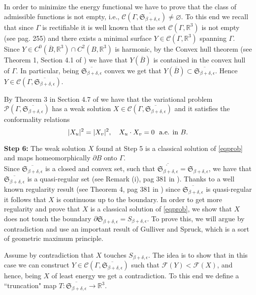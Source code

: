 \documentclass[a4paper,reqno,10pt,oneside]{amsart}
\numberwithin{equation}{section}
\begin{document}
In order to minimize the energy functional we have to prove that the class of admissible functions is not empty, i.e., $\mathcal{C}(\Gamma,\overline{\mathfrak{S}_{\beta+\delta,\epsilon}}) \neq \varnothing$.
To this end we recall that since $\Gamma$ is rectifiable it is well known that the set  $\mathcal{C}(\Gamma,{\mathbb R}^3)$ is not empty (see  \cite{MinSurf} pag. 255) and there exists a minimal surface $Y \in \mathcal{C}(\Gamma,{\mathbb R}^3)$ spanning $\Gamma$. Since $Y \in C^0(\overline{B}, {\mathbb R}^3) \cap C^2({B}, {\mathbb R}^3)$ is harmonic, by the Convex hull theorem (see Theorem 1, Section 4.1 of \cite{RegMinSurf}) we have that $Y(\overline{B})$ is contained in the convex hull of $\Gamma$. In particular, being $\overline{\mathfrak{S}_{\beta+\delta,\epsilon}}$ convex we get that $Y(\overline{B}) \subset\overline{\mathfrak{S}_{\beta+\delta,\epsilon}}$. Hence $Y \in  \mathcal{C}(\Gamma,\overline{\mathfrak{S}_{\beta+\delta,\epsilon}})$.

 By Theorem 3 in Section 4.7 of \cite{RegMinSurf} we have that the variational problem $\mathcal{P}(\Gamma,\overline{\mathfrak{S}_{\beta + \delta,\epsilon}})$ has a weak solution $X \in \mathcal{C}(\Gamma, \overline{\mathfrak{S}_{\beta + \delta,\epsilon}})$ and it satisfies the conformality relations
$$|X_u|^2=|X_v|^2, \ \ \ X_u \cdot X_v=0 \ \ \hbox{a.e. in}\ B. $$

\noindent\textbf{Step 6:} The weak solution $X$ found at Step 5 is a classical solution of \eqref{eqprob} and maps homeomorphically $\partial B$ onto $\Gamma$.\\ 
Since $\overline{\mathfrak{S}_{\beta + \delta,\epsilon}}$ is a closed and convex set, such that $\displaystyle\overline{\mathring{{\mathfrak{S}_{\beta + \delta,\epsilon}}}}={\mathfrak{S}_{\beta + \delta,\epsilon}}$, we have that $\overline{\mathfrak{S}_{\beta + \delta,\epsilon}}$ is a quasi-regular set (see Remark (i), pag 381 in \cite{RegMinSurf}). Thanks to a well known regularity result (see Theorem 4, pag 381 in \cite{RegMinSurf}) since $\overline{\mathfrak{S}_{\beta + \delta,\epsilon}}$ is quasi-regular it follows that $X$ is continuous up to the boundary.
In order to get more regularity and prove that $X$ is a classical solution of \eqref{eqprob}, we show that $X$ does not touch the boundary $\partial \mathfrak{S}_{\beta + \delta,\epsilon}=S_{\beta+\delta, {\epsilon}}$. To prove this, we will argue by contradiction and use an important result of Gulliver and Spruck, which is a sort of geometric maximum principle. 

Assume by contradiction that $X$ touches $S_{\beta + \delta,\epsilon}$. The idea is to show that in this case we can construct $Y \in \mathcal{C}(\Gamma, \overline{\mathfrak{S}_{\beta + \delta,\epsilon}})$ such that $\mathcal{F}(Y)<\mathcal{F}(X)$, and hence, being $X$ of least energy we get a contradiction. To this end we define a ``truncation" map $T\colon\overline{\mathfrak{S}_{\beta + \delta,\epsilon}} \to {\mathbb R}^3$. 
\end{document}
